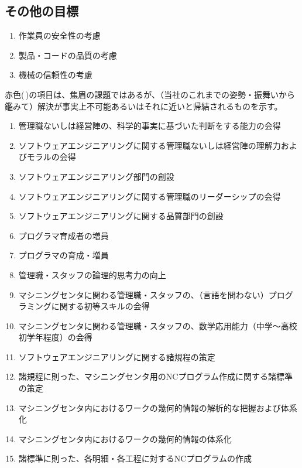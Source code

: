 \subsection{その他の目標}
\begin{enumerate}[label=\sarrow]
\item 作業員の安全性の考慮
\item 製品・コードの品質の考慮
\item 機械の信頼性の考慮
\end{enumerate}


\clearpage
赤色(\,\sarrow[red]\!)の項目は、焦眉の課題ではあるが、（当社のこれまでの姿勢・振舞いから鑑みて）解決が事実上不可能あるいはそれに近いと帰結されるものを示す。
\begin{enumerate}[label=\sarrow]
\item[{\sarrow[red]}] 管理職ないしは経営陣の、科学的事実に基づいた判断をする能力の会得
\item[{\sarrow[red]}] ソフトウェアエンジニアリングに関する管理職ないしは経営陣の理解力およびモラルの会得
\item[{\sarrow[red]}] ソフトウェアエンジニアリング部門の創設
\item[{\sarrow[red]}] ソフトウェアエンジニアリングに関する管理職のリーダーシップの会得
\item[{\sarrow[red]}] ソフトウェアエンジニアリングに関する品質部門の創設
\item[{\sarrow[red]}] プログラマ育成者の増員
\item[{\sarrow[red]}] プログラマの育成・増員
\item[{\sarrow[red]}] 管理職・スタッフの論理的思考力の向上
\item[{\sarrow[red]}] マシニングセンタに関わる管理職・スタッフの、（言語を問わない）プログラミングに関する初等スキルの会得
\item[{\sarrow[red]}] マシニングセンタに関わる管理職・スタッフの、数学応用能力（中学～高校初学年程度）の会得
\item ソフトウェアエンジニアリングに関する諸規程の策定
\item 諸規程に則った、マシニングセンタ用のNCプログラム作成に関する諸標準の策定
\item マシニングセンタ内におけるワークの幾何的情報の解析的な把握および体系化
\item マシニングセンタ内におけるワークの幾何的情報の体系化
\item 諸標準に則った、各明細・各工程に対するNCプログラムの作成
\end{enumerate}


